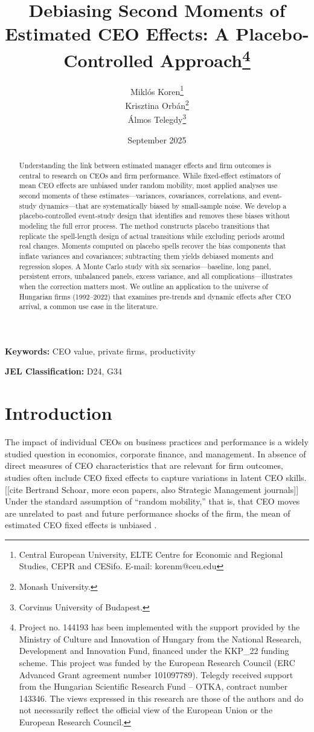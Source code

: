\documentclass[11pt,a4paper]{article}
\title{Debiasing Second Moments of Estimated CEO Effects: A Placebo-Controlled Approach\thanks{Project no. 144193 has been implemented with the support provided by the Ministry of Culture and Innovation of Hungary from the National Research, Development and Innovation Fund, financed under the KKP\_22 funding scheme. This project was funded by the European Research Council (ERC Advanced Grant agreement number 101097789). Telegdy received support from the Hungarian Scientific Research Fund – OTKA, contract number 143346. The views expressed in this research are those of the authors and do not necessarily reflect the official view of the European Union or the European Research Council.}}
\author{Miklós Koren\thanks{Central European University, ELTE Centre for Economic and Regional Studies, CEPR and CESifo. E-mail: korenm@ceu.edu} \\
        Krisztina Orbán\thanks{Monash University.} \\
        Álmos Telegdy\thanks{Corvinus University of Budapest.}}
\date{September 2025}
\begin{document}
\maketitle
\thispagestyle{empty}

\begin{abstract}
Understanding the link between estimated manager effects and firm outcomes is central to research on CEOs and firm performance. While fixed-effect estimators of mean CEO effects are unbiased under random mobility, most applied analyses use second moments of these estimates—variances, covariances, correlations, and event-study dynamics—that are systematically biased by small-sample noise. We develop a placebo-controlled event-study design that identifies and removes these biases without modeling the full error process. The method constructs placebo transitions that replicate the spell-length design of actual transitions while excluding periods around real changes. Moments computed on placebo spells recover the bias components that inflate variances and covariances; subtracting them yields debiased moments and regression slopes. A Monte Carlo study with six scenarios—baseline, long panel, persistent errors, unbalanced panels, excess variance, and all complications—illustrates when the correction matters most. We outline an application to the universe of Hungarian firms (1992--2022) that examines pre-trends and dynamic effects after CEO arrival, a common use case in the literature.
\end{abstract}

\textbf{Keywords:} CEO value, private firms, productivity

\textbf{JEL Classification:} D24, G34

\clearpage
\setcounter{page}{1}

\section{Introduction}

The impact of individual CEOs on business practices and performance is a widely studied question in economics,  corporate finance, and management. In absence of direct measures of CEO characteristics that are relevant for firm outcomes, studies often include CEO fixed effects to capture variations in latent CEO skills. [[cite Bertrand Schoar, more econ papers, also Strategic Management journals]] Under the standard assumption of ``random mobility,'' that is, that CEO moves are unrelated to past and future performance shocks of the firm, the mean of estimated CEO fixed effects is unbiased \citep{}. 
\end{document}
